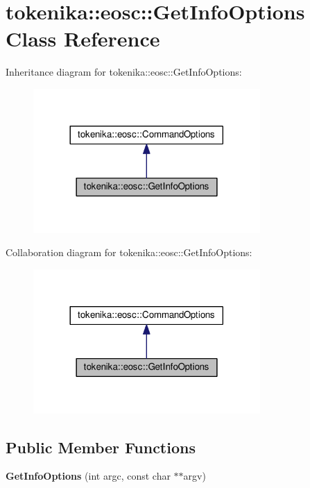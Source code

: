 \hypertarget{classtokenika_1_1eosc_1_1_get_info_options}{}\section{tokenika\+:\+:eosc\+:\+:Get\+Info\+Options Class Reference}
\label{classtokenika_1_1eosc_1_1_get_info_options}


Inheritance diagram for tokenika\+:\+:eosc\+:\+:Get\+Info\+Options\+:\nopagebreak
\begin{figure}[H]
\begin{center}
\leavevmode
\includegraphics[width=245pt]{classtokenika_1_1eosc_1_1_get_info_options__inherit__graph}
\end{center}
\end{figure}


Collaboration diagram for tokenika\+:\+:eosc\+:\+:Get\+Info\+Options\+:\nopagebreak
\begin{figure}[H]
\begin{center}
\leavevmode
\includegraphics[width=245pt]{classtokenika_1_1eosc_1_1_get_info_options__coll__graph}
\end{center}
\end{figure}
\subsection*{Public Member Functions}
\begin{DoxyCompactItemize}
\item 
\mbox{\label{classtokenika_1_1eosc_1_1_get_info_options_a9d3325947476e5eb6f3a44ebd28c02d8}} 
{\bfseries Get\+Info\+Options} (int argc, const char $\ast$$\ast$argv)
\end{DoxyCompactItemize}
